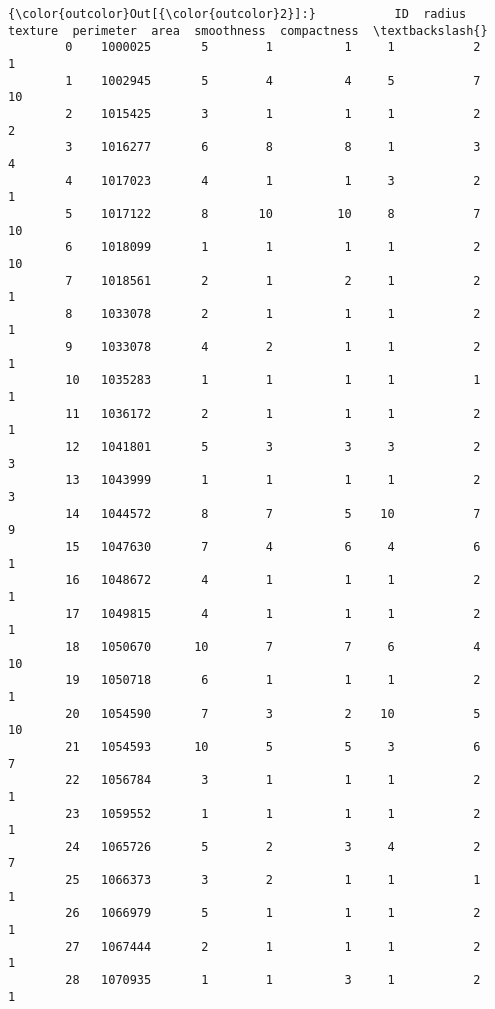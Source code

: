 \documentclass[11pt]{article}
\begin{document}
\begin{Verbatim}[commandchars=\\\{\}]
{\color{outcolor}Out[{\color{outcolor}2}]:}           ID  radius  texture  perimeter  area  smoothness  compactness  \textbackslash{}
        0    1000025       5        1          1     1           2            1   
        1    1002945       5        4          4     5           7           10   
        2    1015425       3        1          1     1           2            2   
        3    1016277       6        8          8     1           3            4   
        4    1017023       4        1          1     3           2            1   
        5    1017122       8       10         10     8           7           10   
        6    1018099       1        1          1     1           2           10   
        7    1018561       2        1          2     1           2            1   
        8    1033078       2        1          1     1           2            1   
        9    1033078       4        2          1     1           2            1   
        10   1035283       1        1          1     1           1            1   
        11   1036172       2        1          1     1           2            1   
        12   1041801       5        3          3     3           2            3   
        13   1043999       1        1          1     1           2            3   
        14   1044572       8        7          5    10           7            9   
        15   1047630       7        4          6     4           6            1   
        16   1048672       4        1          1     1           2            1   
        17   1049815       4        1          1     1           2            1   
        18   1050670      10        7          7     6           4           10   
        19   1050718       6        1          1     1           2            1   
        20   1054590       7        3          2    10           5           10   
        21   1054593      10        5          5     3           6            7   
        22   1056784       3        1          1     1           2            1   
        23   1059552       1        1          1     1           2            1   
        24   1065726       5        2          3     4           2            7   
        25   1066373       3        2          1     1           1            1   
        26   1066979       5        1          1     1           2            1   
        27   1067444       2        1          1     1           2            1   
        28   1070935       1        1          3     1           2            1   

\end{Verbatim}
\end{document}
